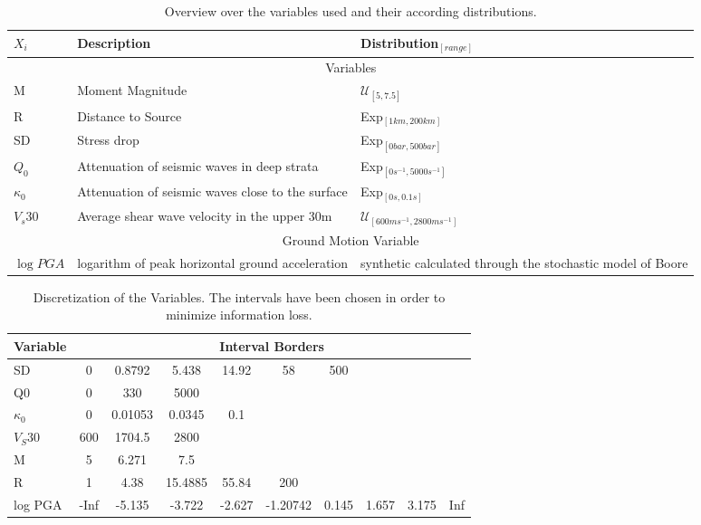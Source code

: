 \vspace{1cm}

\begin{table}[h]
\caption[Variables and Distributions]{Overview over the variables used and their according distributions.}
\begin{tabular}{ p{3cm}p{5cm}p{5cm}  }
\hline
 $X_i$ & Description & Distribution$_{[range]}$\\
 \hline 
 \hline
 \multicolumn{3}{c}{Variables} \\
 \hline
 M   & Moment Magnitude    &$\mathcal{U}_{[5,7.5]}$\\
 R&   Distance to Source  & Exp$_{[1 km, 200km]}$\\
 SD & Stress drop & Exp$_{[0 bar, 500bar]}$\\
 $Q_0$    &Attenuation of seismic waves in deep strata &  Exp$_{[0 s^{-1}, 5000 s^{-1}]}$\\
 $\kappa_0$&   Attenuation of seismic waves close to the surface  &  Exp$_{[0 s, 0.1 s]}$\\
 $V_s30$& Average shear wave velocity in the upper 30m  & $\mathcal{U}_{[600 m s^{-1}, 2800 m s^{-1}]}$\\
 \hline
 \multicolumn{3}{c}{Ground Motion Variable} \\
 \hline
 $\log PGA$& logarithm of peak horizontal ground acceleration  & synthetic calculated through the stochastic model of Boore \citep{boore2003}\\
 \hline
\end{tabular}
\label{tab:Variables}
\end{table}

\vspace{1cm}

\begin{table}[htb]
\caption[Discretization of the Variables]{Discretization of the Variables. The intervals have been chosen in order to minimize information loss.}
\begin{tabular}{l|c c c c c c c c c  }
Variable&   \multicolumn{9}{c}{Interval Borders}\\
\hline
SD&         0&  0.8792&   5.438&  14.92&       58&   500&      &      & \\
Q0&         0&     330&    5000&       &         &      &      &      & \\
$\kappa_0$& 0& 0.01053&  0.0345&    0.1&         &      &      &      & \\
$V_S30$&     600&  1704.5&    2800&       &         &      &      &      & \\
M&          5&   6.271&     7.5&       &         &      &      &      & \\
R&          1&    4.38& 15.4885&  55.84&      200&      &      &      & \\
log PGA& -Inf&  -5.135&  -3.722& -2.627& -1.20742& 0.145& 1.657& 3.175& Inf\\
\end{tabular}
\label{tab:discretization}
\end{table}

